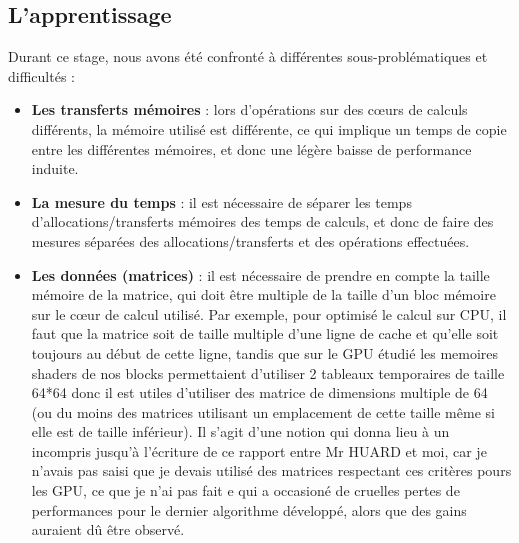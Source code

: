 \documentclass[a4paper,12pt]{article}
\begin{document}
{	\subsection{L'apprentissage}
	\indent Durant ce stage, nous avons \'e{}t\'e confront\'e \`a diff\'e{}rentes sous-probl\'e{}matiques et difficult\'e{}s :
	\begin{itemize}
	    \item \textbf{Les transferts m\'e{}moires} : lors d'opérations sur des c\oe{}urs de calculs diff\'e{}rents, la m\'e{}moire utilis\'e est diff\'e{}rente, ce qui implique un temps de copie entre les diff\'e{}rentes m\'e{}moires, et donc une l\'e{}g\`ere baisse de performance induite.
	    \item \textbf{La mesure du temps} : il est n\'e{}cessaire de s\'e{}parer les temps d'allocations/transferts m\'e{}moires des temps de calculs, et donc de faire des mesures s\'e{}par\'e{}es des allocations/transferts et des opérations effectu\'e{}es.
	    \item \textbf{Les donn\'e{}es (matrices)} : il est n\'e{}cessaire de prendre en compte la taille m\'e{}moire de la matrice, qui doit être multiple de la taille d'un bloc m\'e{}moire sur le c\oe{}ur de calcul utilis\'e. Par exemple, pour optimis\'e{} le calcul sur CPU, il faut que la matrice soit de taille multiple d'une ligne de cache et qu'elle soit toujours au d\'e{}but de cette ligne, tandis que sur le GPU \'e{}tudi\'e{} les memoires shaders de nos blocks permettaient d'utiliser 2 tableaux temporaires de taille 64*64 donc il est utiles d'utiliser des matrice de dimensions multiple de 64 (ou du moins des matrices utilisant un emplacement de cette taille m\^eme si elle est de taille inf\'e{}rieur). Il s'agit d'une notion qui donna lieu \`a un incompris jusqu'\`a l'\'e{}criture de ce rapport entre Mr HUARD et moi, car je n'avais pas saisi que je devais utilis\'e des matrices respectant ces crit\`eres pours les GPU, ce que je n'ai pas fait e qui a occasion\'e de cruelles pertes de performances pour le dernier algorithme d\'e{}velopp\'e{}, alors que des gains auraient d\^u \^etre observ\'e{}.
	\end{itemize}
	\newpage
}
\end{document}
